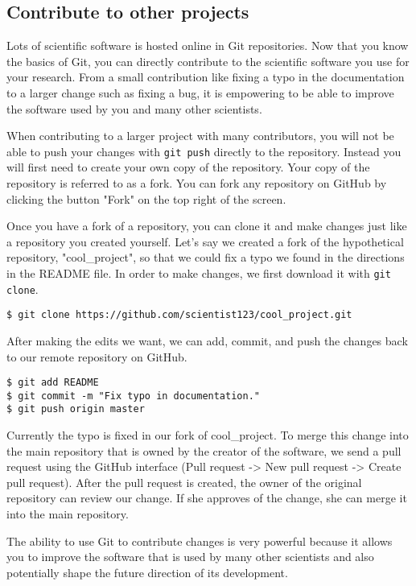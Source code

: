 \subsection{Contribute to other projects}

Lots of scientific software is hosted online in Git repositories.
Now that you know the basics of Git, you can directly contribute to the scientific software you use for your research.
From a small contribution like fixing a typo in the documentation to a larger change such as fixing a bug, it is empowering to be able to improve the software used by you and many other scientists.

When contributing to a larger project with many contributors, you will not be able to push your changes with \verb|git push| directly to the repository.
Instead you will first need to create your own copy of the repository.
Your copy of the repository is referred to as a fork.
You can fork any repository on GitHub by clicking the button "Fork" on the top right of the screen.

Once you have a fork of a repository, you can clone it and make changes just like a repository you created yourself.
Let's say we created a fork of the hypothetical repository, "cool\_project", so that we could fix a typo we found in the directions in the README file.
In order to make changes, we first download it with \verb|git clone|.

\begin{lstlisting}
$ git clone https://github.com/scientist123/cool_project.git
\end{lstlisting}

After making the edits we want, we can add, commit, and push the changes back to our remote repository on GitHub.

\begin{lstlisting}
$ git add README
$ git commit -m "Fix typo in documentation."
$ git push origin master
\end{lstlisting}

Currently the typo is fixed in our fork of cool\_project.
To merge this change into the main repository that is owned by the creator of the software, we send a pull request using the GitHub interface (Pull request -> New pull request -> Create pull request).
After the pull request is created, the owner of the original repository can review our change.
If she approves of the change, she can merge it into the main repository.

The ability to use Git to contribute changes is very powerful because it allows you to improve the software that is used by many other scientists and also potentially shape the future direction of its development.

